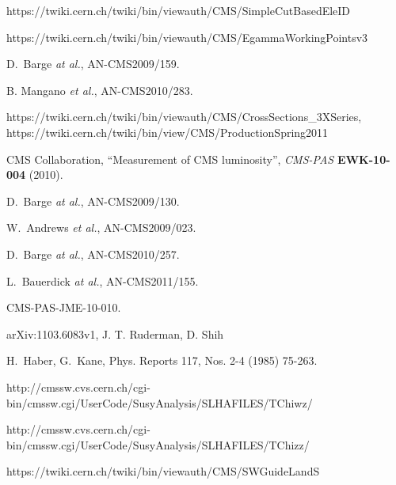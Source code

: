 \begin{thebibliography}{10}
 https://twiki.cern.ch/twiki/bin/viewauth/CMS/SimpleCutBasedEleID

 https://twiki.cern.ch/twiki/bin/viewauth/CMS/EgammaWorkingPointsv3

 D.~Barge {\em at al.}, AN-CMS2009/159.

 B. Mangano {\em et al.}, %
AN-CMS2010/283.

 https://twiki.cern.ch/twiki/bin/viewauth/CMS/CrossSections\_3XSeries, 
https://twiki.cern.ch/twiki/bin/view/CMS/ProductionSpring2011

{CMS Collaboration}, ``Measurement of CMS luminosity'', {\em CMS-PAS} {\bf
  EWK-10-004} (2010).

 D.~Barge {\em at al.}, AN-CMS2009/130.

 W.~Andrews {\em et al.}, AN-CMS2009/023.

 D.~Barge {\em at al.}, AN-CMS2010/257.

 L.~Bauerdick {\em at al.}, AN-CMS2011/155.

 CMS-PAS-JME-10-010.

 arXiv:1103.6083v1, J. T. Ruderman, D. Shih

H.~Haber, G.~Kane, Phys. Reports 117, Nos. 2-4 (1985) 75-263.

 http://cmssw.cvs.cern.ch/cgi-bin/cmssw.cgi/UserCode/SusyAnalysis/SLHAFILES/TChiwz/

 http://cmssw.cvs.cern.ch/cgi-bin/cmssw.cgi/UserCode/SusyAnalysis/SLHAFILES/TChizz/

 https://twiki.cern.ch/twiki/bin/viewauth/CMS/SWGuideLandS

\end{thebibliography}
